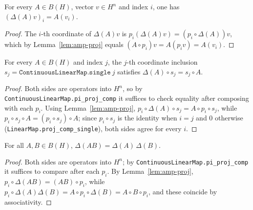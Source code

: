 \begin{lemma}
    \label{lem:amp-apply}
    \leanok
    For every $A \in B(H)$, vector $v \in H^n$ and index $i$, one has
    $(\Delta(A) v)_i = A(v_i)$.
\end{lemma}
\begin{proof}
    The $i$-th coordinate of $\Delta(A) v$ is
    $p_i(\Delta(A) v) = (p_i \circ \Delta(A)) v$, which by
    Lemma~\ref{lem:amp-proj} equals $(A \circ p_i) v = A(p_i v) = A(v_i)$.
\end{proof}

\begin{lemma}
    \label{lem:amp-single}
    \leanok
    For every $A \in B(H)$ and index $j$, the $j$-th coordinate inclusion
    $s_j = \texttt{ContinuousLinearMap.single}\ j$ satisfies
    $\Delta(A) \circ s_j = s_j \circ A$.
\end{lemma}
\begin{proof}
    Both sides are operators into $H^n$, so by
    \texttt{ContinuousLinearMap.pi\_proj\_comp} it suffices to check equality
    after composing with each $p_i$. Using Lemma~\ref{lem:amp-proj},
    $p_i \circ \Delta(A) \circ s_j = A \circ p_i \circ s_j$, while
    $p_i \circ s_j \circ A = (p_i \circ s_j) \circ A$; since $p_i \circ s_j$ is
    the identity when $i = j$ and $0$ otherwise
    (\texttt{LinearMap.proj\_comp\_single}), both sides agree for every
    $i$.
\end{proof}

\begin{lemma}
    \label{lem:amp-map-mul}
    \leanok
    For all $A, B \in B(H)$, $\Delta(A B) = \Delta(A)\,\Delta(B)$.
\end{lemma}
\begin{proof}
    Both sides are operators into $H^n$; by
    \texttt{ContinuousLinearMap.pi\_proj\_comp} it suffices to compare after each
    $p_i$. By Lemma~\ref{lem:amp-proj}, $p_i \circ \Delta(A B) = (A B) \circ p_i$,
    while $p_i \circ \Delta(A)\Delta(B) = A \circ p_i \circ \Delta(B)
    = A \circ B \circ p_i$, and these coincide by associativity.
\end{proof}

